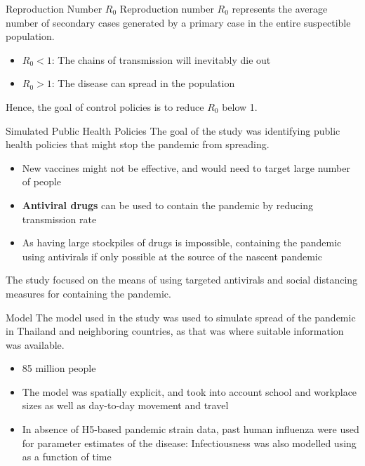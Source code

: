 \documentclass{beamer}
\begin{document}
\begin{frame}{Reproduction Number $R_0$}
Reproduction number $R_0$ represents the average number of secondary cases generated by a primary case in the entire suspectible population.

\begin{itemize}
\item $R_0 < 1$: The chains of transmission will inevitably die out
\item $R_0 > 1$: The disease can spread in the population
\end{itemize}

Hence, the goal of control policies is to reduce $R_0$ below 1.
\end{frame}

\begin{frame}{Simulated Public Health Policies}
The goal of the study was identifying public health policies that might stop the pandemic from spreading.
\begin{itemize}
\item New vaccines might not be effective, and would need to target large number of people
\item \textbf{Antiviral drugs} can be used to contain the pandemic by reducing transmission rate
\item As having large stockpiles of drugs is impossible, containing the pandemic using antivirals if only possible at the source of the nascent pandemic
\end{itemize}
The study focused on the means of using targeted antivirals and social distancing measures for containing the pandemic.
\end{frame}

\begin{frame}{Model}
The model used in the study was used to simulate spread of the pandemic in Thailand and neighboring countries, as that was where suitable information was available.
\begin{itemize}
\item 85 million people
\item The model was spatially explicit, and took into account school and workplace sizes as well as day-to-day movement and travel
\item In absence of H5-based pandemic strain data, past human influenza were used for parameter estimates of the disease: Infectiousness was also modelled using as a function of time
\end{itemize}
\end{frame}
\end{document}
